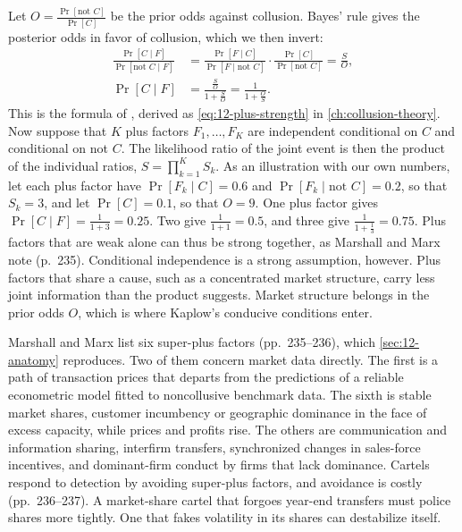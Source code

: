 \begin{remark}\label{rem:13-plus-bayes}
Let $O = \frac{\Pr[\text{not } C]}{\Pr[C]}$ be the prior odds against collusion. Bayes' rule gives the posterior
odds in favor of collusion, which we then invert:
\begin{align*}
  \frac{\Pr[C \mid F]}{\Pr[\text{not } C \mid F]}
    &= \frac{\Pr[F \mid C]}{\Pr[F \mid \text{not } C]}\cdot\frac{\Pr[C]}{\Pr[\text{not } C]} = \frac{S}{O} ,\\
  \Pr[C \mid F] &= \frac{\frac{S}{O}}{1 + \frac{S}{O}} = \frac{1}{1 + \frac{O}{S}} .
\end{align*}
This is the formula of \citet[p.~235, note~42]{MarshallMarx2012}, derived as \eqref{eq:12-plus-strength} in
\cref{ch:collusion-theory}. Now suppose that $K$ plus factors $F_1, \dots, F_K$ are independent conditional on $C$
and conditional on not $C$. The likelihood ratio of the joint event is then the product of the individual ratios,
$S = \prod_{k=1}^{K} S_k$. As an illustration with our own numbers, let each plus factor have
$\Pr[F_k \mid C] = 0.6$ and $\Pr[F_k \mid \text{not } C] = 0.2$, so that $S_k = 3$, and let $\Pr[C] = 0.1$, so that
$O = 9$. One plus factor gives $\Pr[C \mid F] = \frac{1}{1 + 3} = 0.25$. Two give $\frac{1}{1 + 1} = 0.5$, and three
give $\frac{1}{1 + \frac{1}{3}} = 0.75$. Plus factors that are weak alone can thus be strong together, as Marshall
and Marx note (p.~235). Conditional independence is a strong assumption, however. Plus factors that share a cause,
such as a concentrated market structure, carry less joint information than the product suggests. Market structure
belongs in the prior odds $O$, which is where Kaplow's conducive conditions enter.
\end{remark}

Marshall and Marx list six super-plus factors (pp.~235--236), which \cref{sec:12-anatomy} reproduces. Two of them
concern market data directly. The first is a path of transaction prices that departs from the predictions of a
reliable econometric model fitted to noncollusive benchmark data. The sixth is stable market shares, customer
incumbency or geographic dominance in the face of excess capacity, while prices and profits rise. The others are
communication and information sharing, interfirm transfers, synchronized changes in sales-force incentives, and
dominant-firm conduct by firms that lack dominance. Cartels respond to detection by avoiding super-plus factors,
and avoidance is costly (pp.~236--237). A market-share cartel that forgoes year-end transfers must police shares more
tightly. One that fakes volatility in its shares can destabilize itself.

